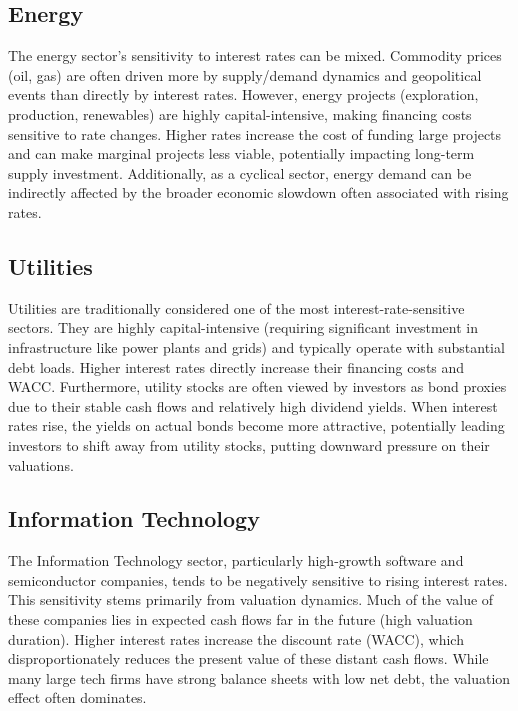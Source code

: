 \subsection{Energy} \label{subsec:industry_energy}
The energy sector's sensitivity to interest rates can be mixed. Commodity prices (oil, gas) are often driven more by supply/demand dynamics and geopolitical events than directly by interest rates. However, energy projects (exploration, production, renewables) are highly capital-intensive, making financing costs sensitive to rate changes. Higher rates increase the cost of funding large projects and can make marginal projects less viable, potentially impacting long-term supply investment. Additionally, as a cyclical sector, energy demand can be indirectly affected by the broader economic slowdown often associated with rising rates.

\subsection{Utilities} \label{subsec:industry_utilities}
Utilities are traditionally considered one of the most interest-rate-sensitive sectors. They are highly capital-intensive (requiring significant investment in infrastructure like power plants and grids) and typically operate with substantial debt loads. Higher interest rates directly increase their financing costs and WACC. Furthermore, utility stocks are often viewed by investors as bond proxies due to their stable cash flows and relatively high dividend yields. When interest rates rise, the yields on actual bonds become more attractive, potentially leading investors to shift away from utility stocks, putting downward pressure on their valuations.

\subsection{Information Technology} \label{subsec:industry_it}
The Information Technology sector, particularly high-growth software and semiconductor companies, tends to be negatively sensitive to rising interest rates. This sensitivity stems primarily from valuation dynamics. Much of the value of these companies lies in expected cash flows far in the future (high valuation duration). Higher interest rates increase the discount rate (WACC), which disproportionately reduces the present value of these distant cash flows. While many large tech firms have strong balance sheets with low net debt, the valuation effect often dominates.

